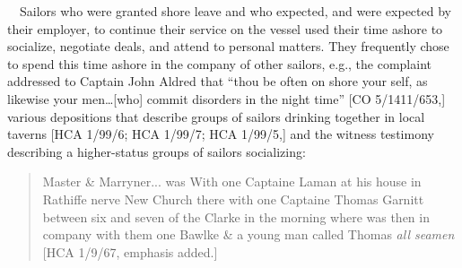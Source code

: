 \begin{styleStandard}
\ \ Sailors who were granted shore leave and who expected, and were expected by their employer, to continue their service on the vessel used their time ashore to socialize, negotiate deals, and attend to personal matters. They frequently chose to spend this time ashore in the company of other sailors, e.g., the complaint addressed to Captain John Aldred that “thou be often on shore your self, as likewise your men…[who] commit disorders in the night time” [CO 5/1411/653,] various depositions that describe groups of sailors drinking together in local taverns [HCA 1/99/6; HCA 1/99/7; HCA 1/99/5,] and the witness testimony describing a higher-status groups of sailors socializing:
\end{styleStandard}


\begin{quotation}
Master \& Marryner... was With one Captaine Laman at his house in Rathiffe nerve New Church there with one Captaine Thomas Garnitt between six and seven of the Clarke in the morning where was then in company with them one Bawlke \& a young man called Thomas \textit{all seamen} [HCA 1/9/67, emphasis added.] 

\end{quotation}
